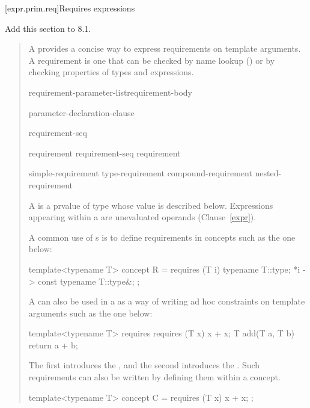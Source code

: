 \setcounter{subsection}{6}
[expr.prim.req]{Requires expressions}

Add this section to 8.1.

\begin{quote}
\begin{addedblock}

\pnum
A  provides a concise way to express 
requirements on template arguments. 
% 
A requirement is one that can be checked by name lookup
() or by checking properties of types and expressions.

\begin{bnf}
\br
     requirement-parameter-list\opt requirement-body

\br
    \terminal{(} parameter-declaration-clause\opt~\terminal{)}
  
\br
    \terminal{\{} requirement-seq \terminal{\}}

\br
    requirement\br
    requirement-seq requirement

\br
    simple-requirement\br
    type-requirement\br
    compound-requirement\br
    nested-requirement
\end{bnf}

\pnum
A  is a prvalue of type  whose
value is described below.
Expressions appearing within a 
are unevaluated operands (Clause~\ref{expr}).

\pnum
\enterexample
A common use of s is to define
requirements in concepts such as the one below:
\begin{codeblock}
template<typename T>
  concept R = requires (T i) {
    typename T::type;
    {*i} -> const typename T::type&;
  };
\end{codeblock}
A  can also be used in a 
 as a way of writing ad hoc 
constraints on template arguments such as the one below:
\begin{codeblock}
template<typename T>
  requires requires (T x) { x + x; }
    T add(T a, T b) { return a + b; }
\end{codeblock}
The first  introduces the 
, and the second
introduces the .
\exitexample
\enternote
Such requirements can also be written by defining them within
a concept.
\begin{codeblock}
template<typename T>
  concept C = requires (T x) { x + x; };


\end{codeblock}
\end{addedblock}
\end{quote}
